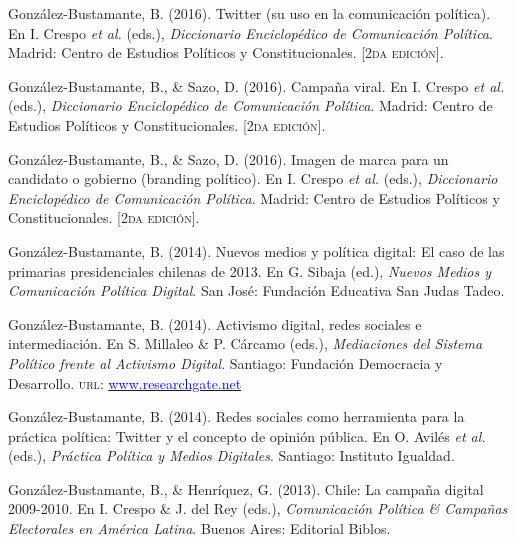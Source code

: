 \begin{publications}
\begin{benumerate}{12}
\item{\small Gonz\'alez-Bustamante, B. (2016). Twitter (su uso en la comunicación política). En I. Crespo {\itshape et al.} (eds.), {\itshape Diccionario Enciclop\'edico de Comunicaci\'on Pol\'itica}. Madrid: Centro de Estudios Políticos y Constitucionales. {\footnotesize \scshape [2da edición]}.} \vspace{1mm}

\item{\small Gonz\'alez-Bustamante, B., \& Sazo, D. (2016). Campaña viral. En I. Crespo {\itshape et al.} (eds.), {\itshape Diccionario Enciclop\'edico de Comunicaci\'on Pol\'itica}. Madrid: Centro de Estudios Políticos y Constitucionales. {\footnotesize \scshape [2da edición]}.} \vspace{1mm}

\item{\small Gonz\'alez-Bustamante, B., \& Sazo, D. (2016). Imagen de marca para un candidato o gobierno (branding político). En I. Crespo {\itshape et al.} (eds.), {\itshape Diccionario Enciclop\'edico de Comunicaci\'on Pol\'itica}. Madrid: Centro de Estudios Políticos y Constitucionales. {\footnotesize \scshape [2da edición]}.} \vspace{1mm}

\item{\small Gonz\'alez-Bustamante, B. (2014). Nuevos medios y política digital: El caso de las primarias presidenciales chilenas de 2013. En G. Sibaja (ed.), {\itshape Nuevos Medios y Comunicaci\'on Pol\'itica Digital}. San José: Fundación Educativa San Judas Tadeo.} \vspace{1mm}

\item{\small Gonz\'alez-Bustamante, B. (2014). Activismo digital, redes sociales e intermediación. En S. Millaleo \& P. C\'arcamo (eds.), {\itshape Mediaciones del Sistema Pol\'itico frente al Activismo Digital}. Santiago: Fundación Democracia y Desarrollo. {\scshape url}: \href{https://www.researchgate.net/publication/321992867_Activismo_digital_redes_sociales_e_intermediacion}{\textcolor{blue}{www.researchgate.net}}} \vspace{1mm}

\item{\small Gonz\'alez-Bustamante, B. (2014). Redes sociales como herramienta para la pr\'actica pol\'itica: Twitter y el concepto de opini\'on p\'ublica. En O. Avil\'es {\itshape et al.} (eds.), {\itshape Pr\'actica Pol\'itica y Medios Digitales}. Santiago: Instituto Igualdad.} \vspace{1mm}

\item{\small Gonz\'alez-Bustamante, B., \& Henr\'iquez, G. (2013). Chile: La campaña digital 2009-2010. En I. Crespo \& J. del Rey (eds.), {\itshape Comunicaci\'on Pol\'itica \& Campa\~nas Electorales en Am\'erica Latina}. Buenos Aires: Editorial Biblos.} \vspace{1mm}
\end{benumerate}

\end{publications}
